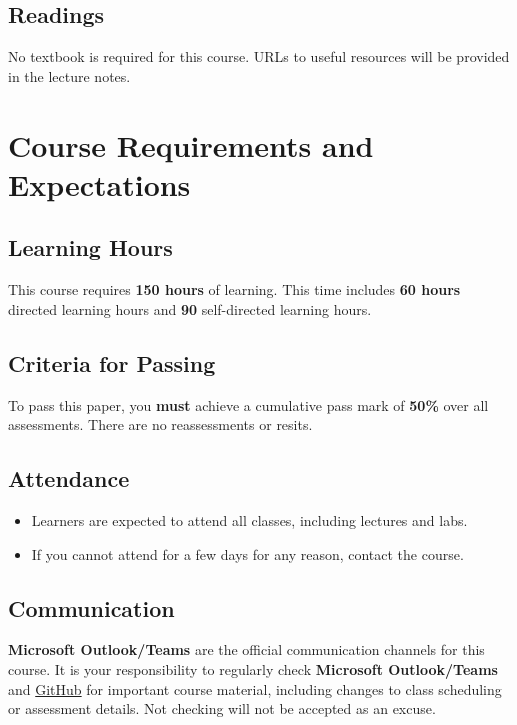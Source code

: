 \documentclass{article}
\begin{document}
\subsection*{Readings}
No textbook is required for this course. URLs to useful resources will be provided in the lecture notes.

\section*{Course Requirements and Expectations}

\subsection*{Learning Hours}
This course requires \textbf{150 hours} of learning. This time includes \textbf{60 hours} directed learning hours and \textbf{90} self-directed learning hours.

\subsection*{Criteria for Passing}
To pass this paper, you \textbf{must} achieve a cumulative pass mark of \textbf{50\%} over all assessments. There are no reassessments or resits. 

\subsection*{Attendance}
\begin{itemize}
	\item Learners are expected to attend all classes, including lectures and labs.
	\item If you cannot attend for a few days for any reason, contact the course.
\end{itemize} 

\subsection*{Communication}
\textbf{Microsoft Outlook/Teams} are the official communication channels for this course. It is your responsibility to regularly check \textbf{Microsoft Outlook/Teams} and \href{https://github.com/otago-polytechnic-bit-courses/ID511001-programming-2}{GitHub} for important course material, including changes to class scheduling or assessment details. Not checking will not be accepted as an excuse.
\end{document}
